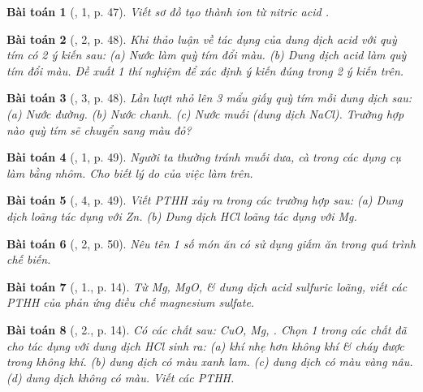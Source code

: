 \documentclass{article}
\newtheorem{baitoan}{Bài toán}
\begin{document}
\begin{baitoan}[\cite{SGK_KHTN_8_Canh_Dieu}, 1, p. 47]
	Viết sơ đồ tạo thành ion \emph{} từ nitric acid \emph{}.
\end{baitoan}

\begin{baitoan}[\cite{SGK_KHTN_8_Canh_Dieu}, 2, p. 48]
	Khi thảo luận về tác dụng của dung dịch acid với quỳ tím có 2 ý kiến sau: (a) Nước làm quỳ tím đổi màu. (b) Dung dịch acid làm quỳ tím đổi màu. Đề xuất 1 thí nghiệm để xác định ý kiến đúng trong 2 ý kiến trên.
\end{baitoan}

\begin{baitoan}[\cite{SGK_KHTN_8_Canh_Dieu}, 3, p. 48]
	Lần lượt nhỏ lên 3 mẩu giấy quỳ tím mỗi dung dịch sau: (a) Nước đường. (b) Nước chanh. (c) Nước muối (dung dịch \emph{NaCl}). Trường hợp nào quỳ tím sẽ chuyển sang màu đỏ?
\end{baitoan}

\begin{baitoan}[\cite{SGK_KHTN_8_Canh_Dieu}, 1, p. 49]
	Người ta thường tránh muối dưa, cà trong các dụng cụ làm bằng nhôm. Cho biết lý do của việc làm trên.
\end{baitoan}

\begin{baitoan}[\cite{SGK_KHTN_8_Canh_Dieu}, 4, p. 49]
	Viết PTHH xảy ra trong các trường hợp sau: (a) Dung dịch \emph{} loãng tác dụng với \emph{Zn}. (b) Dung dịch \emph{HCl} loãng tác dụng với \emph{Mg}.
\end{baitoan}

\begin{baitoan}[\cite{SGK_KHTN_8_Canh_Dieu}, 2, p. 50]
	Nêu tên 1 số món ăn có sử dụng giấm ăn trong quá trình chế biến.
\end{baitoan}

\begin{baitoan}[\cite{SGK_Hoa_Hoc_9}, 1., p. 14]
	Từ \emph{Mg, MgO, } \& dung dịch acid sulfuric loãng, viết các PTHH của phản ứng điều chế magnesium sulfate.
\end{baitoan}

\begin{baitoan}[\cite{SGK_Hoa_Hoc_9}, 2., p. 14]
	Có các chất sau: \emph{CuO, Mg, }. Chọn 1 trong các chất đã cho tác dụng với dung dịch \emph{HCl} sinh ra: (a) khí nhẹ hơn không khí \& cháy được trong không khí. (b) dung dịch có màu xanh lam. (c) dung dịch có màu vàng nâu. (d) dung dịch không có màu. Viết các PTHH.
\end{baitoan}
\end{document}
